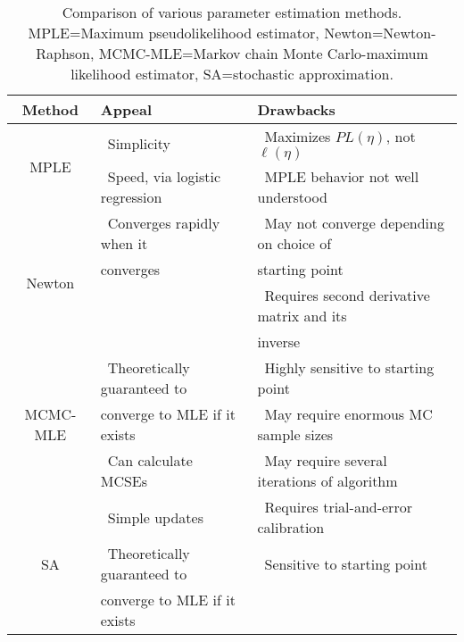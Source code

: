 \begin{table}[h] 
\caption[Comparison of various parameter estimation methods]{Comparison of various parameter estimation methods. MPLE=Maximum pseudolikelihood estimator, Newton=Newton-Raphson,
MCMC-MLE=Markov chain Monte Carlo-maximum likelihood estimator, SA=stochastic approximation.}
\begin{tabular}{|c|l|l|}
\hline 
Method & Appeal & Drawbacks \\ [1ex]
\hline
\multirow{2}{0.5in}{MPLE}		
& 	\textbullet \, Simplicity 				  	& \textbullet \, Maximizes $PL(\eta)$, not $\ell(\eta)$  \\
& 	\textbullet \, Speed, via logistic regression 	& \textbullet \, MPLE behavior not well understood \\ [1ex]
\hline
\multirow{4}{0.5in}{Newton}
& 	\textbullet \, Converges rapidly when it   	& \textbullet \, May not converge depending on choice of\\ 
& 	converges 	& starting point \\				
&				& \textbullet \, Requires second derivative matrix and its\\
&				& inverse \\[1ex]
\hline
\multirow{3}{0.5in}{MCMC-MLE}
& 	\textbullet \, Theoretically guaranteed to   	& \textbullet \, Highly sensitive to starting point \\ 
& 	converge to MLE if it exists 					& \textbullet \, May require enormous MC sample sizes\\ 
&	\textbullet \, Can calculate MCSEs			& \textbullet \, May require several iterations of algorithm\\ [1ex]
\hline
\multirow{3}{0.5in}{SA} 		
& 	\textbullet \, Simple updates 				& \textbullet \, Requires trial-and-error calibration  \\			& 	\textbullet \, Theoretically guaranteed to		& \textbullet \, Sensitive to starting point \\
& 	converge to MLE if it exists & \\[1ex]
\hline 
\end{tabular}
\end{table}



